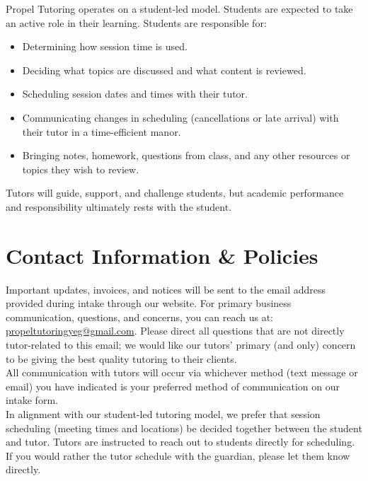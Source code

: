 \documentclass{article}
\begin{document}
Propel Tutoring operates on a student-led model. Students are expected to take an active role in their learning. Students are responsible for:

\begin{itemize}
   \item Determining how session time is used.
   \item Deciding what topics are discussed and what content is reviewed.
   \item Scheduling session dates and times with their tutor.
   \item Communicating changes in scheduling (cancellations or late arrival) with their tutor in a time-efficient manor.
   \item Bringing notes, homework, questions from class, and any other resources or topics they wish to review.
\end{itemize}

Tutors will guide, support, and challenge students, but academic performance and responsibility ultimately rests with the student.

\section{Contact Information \& Policies}
Important updates, invoices, and notices will be sent to the email address provided during intake through our website. For primary business communication, questions, and concerns, you can reach us at: \href{mailto:propeltutoringyeg@gmail.com}{propeltutoringyeg@gmail.com}. Please direct all questions that are not directly tutor-related to this email; we would like our tutors' primary (and only) concern to be giving the best quality tutoring to their clients.\\

All communication with tutors will occur via whichever method (text message or email) you have indicated is your preferred method of communication on our intake form.\\

In alignment with our student-led tutoring model, we prefer that session scheduling (meeting times and locations) be decided together between the student and tutor. Tutors are instructed to reach out to students directly for scheduling. If you would rather the tutor schedule with the guardian, please let them know directly.
\end{document}
